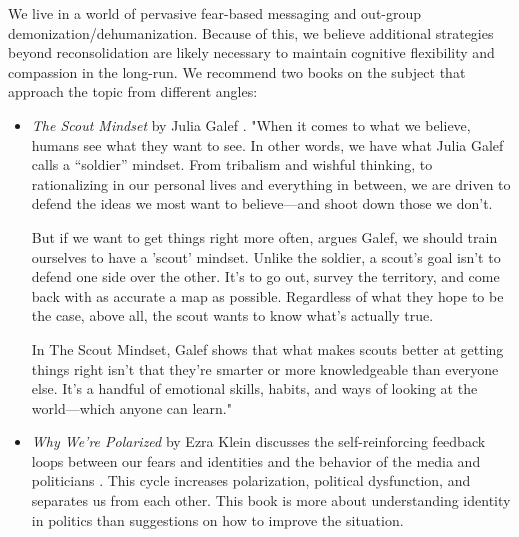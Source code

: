 \documentclass[12pt,letterpaper]{book}
\begin{document}
We live in a world of pervasive fear-based messaging and out-group demonization/dehumanization. Because of this, we believe additional strategies beyond reconsolidation are likely necessary to maintain cognitive flexibility and compassion in the long-run. We recommend two books on the subject that approach the topic from different angles:

\begin{itemize}
    \item \textit{The Scout Mindset} by Julia Galef \cite{galefScoutMindset}. "When it comes to what we believe, humans see what they want to see. In other words, we have what Julia Galef calls a “soldier” mindset. From tribalism and wishful thinking, to rationalizing in our personal lives and everything in between, we are driven to defend the ideas we most want to believe—and shoot down those we don't.

    But if we want to get things right more often, argues Galef, we should train ourselves to have a 'scout' mindset. Unlike the soldier, a scout's goal isn't to defend one side over the other. It's to go out, survey the territory, and come back with as accurate a map as possible. Regardless of what they hope to be the case, above all, the scout wants to know what's actually true.
    
    In The Scout Mindset, Galef shows that what makes scouts better at getting things right isn't that they're smarter or more knowledgeable than everyone else. It's a handful of emotional skills, habits, and ways of looking at the world—which anyone can learn."
    \item \textit{Why We're Polarized} by Ezra Klein discusses the self-reinforcing feedback loops between our fears and identities and the behavior of the media and politicians \cite{klein2020Polarized}. This cycle increases polarization, political dysfunction, and separates us from each other. This book is more about understanding identity in politics than suggestions on how to improve the situation.
\end{itemize}
\end{document}
